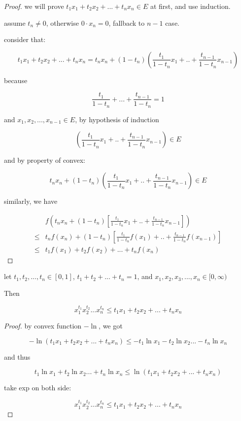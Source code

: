 \documentclass[11pt,a4paper]{article}
\begin{document}
\begin{proof}
    we will prove $t_1x_1 + t_2x_2 + ... + t_nx_n \in E$ at first, and use induction.

    assume $t_n \ne 0$, otherwise $0 \cdot x_n = 0$, fallback to $n-1$ case.

    consider that:

    \[
        t_1x_1 + t_2x_2 + ... + t_nx_n = t_nx_n + (1-t_n)\left( \frac{t_1}{1-t_n}x_1 + .. + \frac{t_{n-1}}{1-t_{n}}x_{n-1} \right)
    \]

    because 

    \[
        \frac{t_1}{1-t_n} + ... + \frac{t_{n-1}}{1-t_n} = 1
    \]

    and $x_1,x_2,...,x_{n-1} \in E$, by hypothesis of induction

    \[
        \left( \frac{t_1}{1-t_n}x_1 + .. + \frac{t_{n-1}}{1-t_{n}}x_{n-1} \right) \in E
    \]

    and by property of convex:

    \[
        t_nx_n + (1-t_n)\left( \frac{t_1}{1-t_n}x_1 + .. + \frac{t_{n-1}}{1-t_{n}}x_{n-1} \right) \in E
    \]

    similarly, we have

    \begin{align*}
        &f\left(t_nx_n + (1-t_n)\left[ \frac{t_1}{1-t_n}x_1 + .. + \frac{t_{n-1}}{1-t_{n}}x_{n-1} \right]\right) \\
        \le & t_nf(x_n) + (1-t_n) \left[ \frac{t_1}{1-t_n}f(x_1) + .. + \frac{t_{n-1}}{1-t_{n}}f(x_{n-1}) \right] \\
        \le & t_1f(x_1) + t_2f(x_2) + ... + t_nf(x_n)
    \end{align*}
\end{proof}

\begin{thm}[AM-GM Inequality]
    let $t_1,t_2,...,t_n \in [0,1]$, $t_1 + t_2 + ... + t_n = 1$, and $x_1,x_2,x_3,...,x_n \in [0,\infty)$

    Then

    \[
        x_1^{t_1}x_2^{t_2} ... x_n^{t_n} \le t_1x_1 + t_2x_2 + ... +t_nx_n 
    \]
\end{thm}

\begin{proof}
    by convex function $-\ln$, we got

    \[
        -\ln(t_1x_1 + t_2x_2 + ... +t_nx_n) \le - t_1 \ln x_1 -  t_2 \ln x_2 ... - t_n \ln x_n
    \]

    and thus


    \[
         t_1 \ln x_1 +  t_2 \ln x_2 ... + t_n \ln x_n \le \ln(t_1x_1 + t_2x_2 + ... +t_nx_n) 
    \]

    take exp on both side:

    \[
        x_1^{t_1}x_2^{t_2} ... x_n^{t_n} \le t_1x_1 + t_2x_2 + ... +t_nx_n 
    \]
\end{proof}
\end{document}
